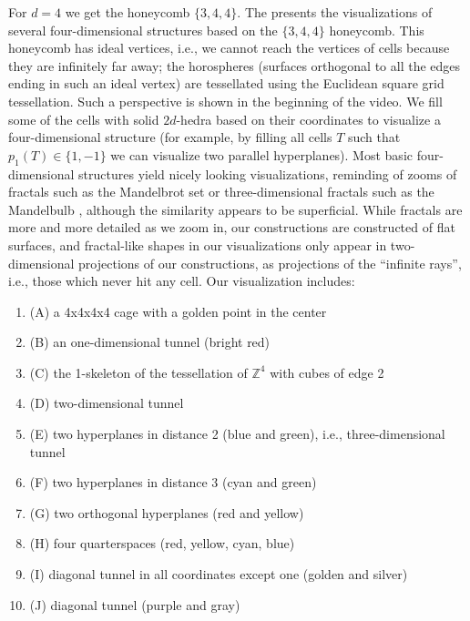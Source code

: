 \documentclass{article}
\begin{document}
For $d=4$ we get the honeycomb $\{3,4,4\}$. The 
 presents the visualizations of several four-dimensional structures based on
the $\{3,4,4\}$ honeycomb. This honeycomb has ideal vertices, i.e., we cannot reach the vertices of cells because
they are infinitely far away; the horospheres (surfaces orthogonal to all the edges ending in such an ideal vertex) 
are tessellated using the Euclidean square grid tessellation. Such a perspective is shown in the beginning of the video.
We fill some of the cells with solid $2d$-hedra based on their coordinates to visualize a four-dimensional structure (for example,
by filling all cells $T$  such that $p_1(T) \in \{1,-1\}$ we can visualize two parallel hyperplanes). 
Most basic four-dimensional structures yield nicely looking visualizations, reminding of zooms of fractals such as the Mandelbrot set
or three-dimensional fractals such as the Mandelbulb \cite{mandelbulb}, although the similarity appears to be superficial. While fractals
are more and more detailed as we zoom in, our constructions are constructed of flat surfaces, and fractal-like shapes in our visualizations
only appear in two-dimensional projections of our constructions, as projections of the ``infinite rays'', i.e., those which never hit any
cell. Our visualization includes:

\begin{enumerate}
\item (A) a 4x4x4x4 cage with a golden point in the center
\item (B) an one-dimensional tunnel (bright red)
\item (C) the 1-skeleton of the tessellation of $\mathbb{Z}^4$ with cubes of edge 2
\item (D) two-dimensional tunnel
\item (E) two hyperplanes in distance 2 (blue and green), i.e., three-dimensional tunnel
\item (F) two hyperplanes in distance 3 (cyan and green)
\item (G) two orthogonal hyperplanes (red and yellow)
\item (H) four quarterspaces (red, yellow, cyan, blue)
\item (I) diagonal tunnel in all coordinates except one (golden and silver)
\item (J) diagonal tunnel (purple and gray)
\end{enumerate}
\end{document}

